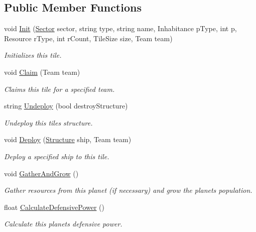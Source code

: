 \subsection*{Public Member Functions}
\begin{DoxyCompactItemize}
\item 
void \hyperlink{class_tile_a6c6245ca6081374c89f24d8127852701}{Init} (\hyperlink{class_sector}{Sector} sector, string type, string name, Inhabitance p\+Type, int p, Resource r\+Type, int r\+Count, Tile\+Size size, Team team)
\begin{DoxyCompactList}\small\item\em Initializes this tile. \end{DoxyCompactList}\item 
void \hyperlink{class_tile_a62a229c715955e1e073eef742c18f6aa}{Claim} (Team team)
\begin{DoxyCompactList}\small\item\em Claims this tile for a specified team. \end{DoxyCompactList}\item 
string \hyperlink{class_tile_a6c1f5cb6c14376f6b56b71af5a8ea0bf}{Undeploy} (bool destroy\+Structure)
\begin{DoxyCompactList}\small\item\em Undeploy this tile\textquotesingle{}s structure. \end{DoxyCompactList}\item 
void \hyperlink{class_tile_a0387842ae96d1a56bad7a6b7d03fb0c0}{Deploy} (\hyperlink{class_structure}{Structure} ship, Team team)
\begin{DoxyCompactList}\small\item\em Deploy a specified ship to this tile. \end{DoxyCompactList}\item 
void \hyperlink{class_tile_a0c500ad3298b1bf5889354e93dd4a12d}{Gather\+And\+Grow} ()
\begin{DoxyCompactList}\small\item\em Gather resources from this planet (if necessary) and grow the planet\textquotesingle{}s population. \end{DoxyCompactList}\item 
float \hyperlink{class_tile_aac077bfa2782b5a4d03eb8683d3c0c97}{Calculate\+Defensive\+Power} ()
\begin{DoxyCompactList}\small\item\em Calculate this planet\textquotesingle{}s defensive power. \end{DoxyCompactList}\item 

\end{DoxyCompactItemize}
